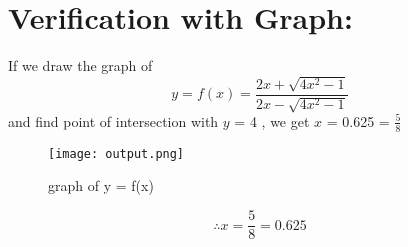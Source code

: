 \documentclass[twocolumn]{article}
\begin{document}
\section*{Verification with Graph:}
If we draw the graph of 
\begin{equation*} 
y = f(x) = \frac{2x+\sqrt{4x^2-1}}{2x-\sqrt{4x^2-1}}
\end{equation*}
 and find point of intersection with $y$ = 4  , we get $x$ = 0.625 = $\frac{5}{8}$ \\ 
\begin{figure}[h]
\texttt{[image: output.png]}
\caption{graph of y = f(x)}
\end{figure}
\begin{equation*}
\therefore x = \frac{5}{8} = 0.625 
\end{equation*}
\end{document}
